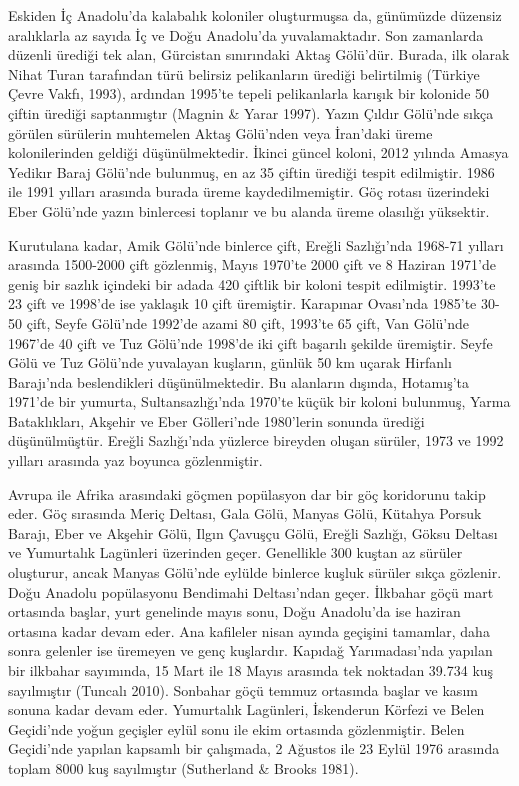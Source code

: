 \documentclass[
  letterpaper,
  DIV=11,
  numbers=noendperiod]{scrreprt}
\begin{document}
Eskiden İç Anadolu'da kalabalık koloniler oluşturmuşsa da, günümüzde
düzensiz aralıklarla az sayıda İç ve Doğu Anadolu'da yuvalamaktadır. Son
zamanlarda düzenli ürediği tek alan, Gürcistan sınırındaki Aktaş
Gölü'dür. Burada, ilk olarak Nihat Turan tarafından türü belirsiz
pelikanların ürediği belirtilmiş (Türkiye Çevre Vakfı, 1993), ardından
1995'te tepeli pelikanlarla karışık bir kolonide 50 çiftin ürediği
saptanmıştır (Magnin \& Yarar 1997). Yazın Çıldır Gölü'nde sıkça görülen
sürülerin muhtemelen Aktaş Gölü'nden veya İran'daki üreme kolonilerinden
geldiği düşünülmektedir. İkinci güncel koloni, 2012 yılında Amasya
Yedikır Baraj Gölü'nde bulunmuş, en az 35 çiftin ürediği tespit
edilmiştir. 1986 ile 1991 yılları arasında burada üreme
kaydedilmemiştir. Göç rotası üzerindeki Eber Gölü'nde yazın binlercesi
toplanır ve bu alanda üreme olasılığı yüksektir.

Kurutulana kadar, Amik Gölü'nde binlerce çift, Ereğli Sazlığı'nda
1968-71 yılları arasında 1500-2000 çift gözlenmiş, Mayıs 1970'te 2000
çift ve 8 Haziran 1971'de geniş bir sazlık içindeki bir adada 420
çiftlik bir koloni tespit edilmiştir. 1993'te 23 çift ve 1998'de ise
yaklaşık 10 çift üremiştir. Karapınar Ovası'nda 1985'te 30-50 çift,
Seyfe Gölü'nde 1992'de azami 80 çift, 1993'te 65 çift, Van Gölü'nde
1967'de 40 çift ve Tuz Gölü'nde 1998'de iki çift başarılı şekilde
üremiştir. Seyfe Gölü ve Tuz Gölü'nde yuvalayan kuşların, günlük 50 km
uçarak Hirfanlı Barajı'nda beslendikleri düşünülmektedir. Bu alanların
dışında, Hotamış'ta 1971'de bir yumurta, Sultansazlığı'nda 1970'te küçük
bir koloni bulunmuş, Yarma Bataklıkları, Akşehir ve Eber Gölleri'nde
1980'lerin sonunda ürediği düşünülmüştür. Ereğli Sazlığı'nda yüzlerce
bireyden oluşan sürüler, 1973 ve 1992 yılları arasında yaz boyunca
gözlenmiştir.

Avrupa ile Afrika arasındaki göçmen popülasyon dar bir göç koridorunu
takip eder. Göç sırasında Meriç Deltası, Gala Gölü, Manyas Gölü, Kütahya
Porsuk Barajı, Eber ve Akşehir Gölü, Ilgın Çavuşçu Gölü, Ereğli Sazlığı,
Göksu Deltası ve Yumurtalık Lagünleri üzerinden geçer. Genellikle 300
kuştan az sürüler oluşturur, ancak Manyas Gölü'nde eylülde binlerce
kuşluk sürüler sıkça gözlenir. Doğu Anadolu popülasyonu Bendimahi
Deltası'ndan geçer. İlkbahar göçü mart ortasında başlar, yurt genelinde
mayıs sonu, Doğu Anadolu'da ise haziran ortasına kadar devam eder. Ana
kafileler nisan ayında geçişini tamamlar, daha sonra gelenler ise
üremeyen ve genç kuşlardır. Kapıdağ Yarımadası'nda yapılan bir ilkbahar
sayımında, 15 Mart ile 18 Mayıs arasında tek noktadan 39.734 kuş
sayılmıştır (Tuncalı 2010). Sonbahar göçü temmuz ortasında başlar ve
kasım sonuna kadar devam eder. Yumurtalık Lagünleri, İskenderun Körfezi
ve Belen Geçidi'nde yoğun geçişler eylül sonu ile ekim ortasında
gözlenmiştir. Belen Geçidi'nde yapılan kapsamlı bir çalışmada, 2 Ağustos
ile 23 Eylül 1976 arasında toplam 8000 kuş sayılmıştır (Sutherland \&
Brooks 1981).
\end{document}
